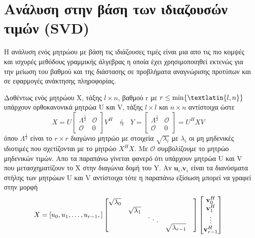 \section{Ανάλυση στην βάση των ιδιαζουσών τιμών (\textlatin{SVD})}
\par
Η ανάλυση ενός μητρώου με βάση τις ιδιάζουσες τιμές είναι μια απο τις πιο κομψές και ισχυρές μεθόδους γραμμικής άλγεβρας η οποία έχει χρησιμοποιηθεί εκτενώς για την μείωση του βαθμού και της διάστασης σε προβλήματα αναγνώρισης προτύπων και σε εφαρμογές ανάκτησης πληροφορίας.
\par
Δοθέντως ενός μητρώου Χ, τάξης $l \times n$, βαθμού \textlatin{r} με $r \leq \min \lbrace \textlatin{l,n} \rbrace $ υπάρχουν ορθοκανονικά μητρώα \textlatin{U} και \textlatin{V}, τάξης $l \times l$ και $n \times n$ αντίστοιχα ώστε
\newline\hspace*{\fill}
\begin{equation}
	X = U\begin{bmatrix}
	\Lambda^{\frac{1}{2}} & \mathcal{O} \\
	\mathcal{O} & 0
	\end{bmatrix} V^{H} \quad \text{ή} \quad
	Y = \begin{bmatrix}
	\Lambda^{\frac{1}{2}} & \mathcal{O} \\
	\mathcal{O} & 0
	\end{bmatrix} = U^{H}XV 
\end{equation}
\hspace*{\fill}\newline
όπου $ \Lambda^{\frac{1}{2}} $ είναι το $r \times r$ διαγώνιο μητρώο με στοιχεία $ \sqrt{\lambda_{i}} $ με $ \lambda_{i} $ οι μη μηδενικές ιδιοτιμές που σχετίζονται με το μητρώο $X^{H}X$. Με $ \mathcal{O} $ συμβολίζουμε το μητρώο μηδενικών τιμών. Απο τα παραπάνω γίνεται φανερό ότι υπάρχουν μητρώα \textlatin{U} και \textlatin{V} που μετασχηματίζουν το \textlatin{X} στην διαγώνια δομή του \textlatin{Y}. Αν $ \mathbf{u}_{i}$,$\mathbf{v}_{i} $ είναι τα διανύσματα στήλης των μητρώων \textlatin{U} και \textlatin{V} αντίστοιχα τότε η παραπάνω εξίσωση μπορεί να γραφεί στην μορφή
\newline\hspace*{\fill}
\begin{equation}
         X = [u_{0},u_{1},\ldots,u_{r-1},] \begin{bmatrix}
\sqrt{\lambda_{0}} &&&& \\
&\sqrt{\lambda_{1}} &&& \\
&& \raise 4pt \hbox {.}
  \mkern 6mu
  \raise 1pt \hbox {.}
  \mkern 6mu
  \raise -2pt \hbox {.} \\
&&& \sqrt{\lambda_{r-1}} \\
\end{bmatrix}
\begin{bmatrix}
	\mathbf{v}_{0}^{H} \\
	\mathbf{v}_{1}^{H} \\
	\vdots \\
	\mathbf{v}_{r-1}^{H} \\
\end{bmatrix}
\end{equation}
